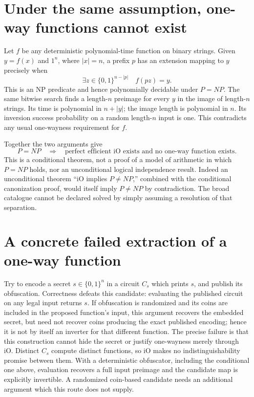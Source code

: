 \documentclass[11pt]{article}
\begin{document}
\section{Under the same assumption, one-way functions cannot exist}
Let $f$ be any deterministic polynomial-time function on binary strings.
Given $y=f(x)$ and $1^n$, where $|x|=n$, a prefix $p$ has an extension
mapping to $y$ precisely when
\[
\exists z\in\{0,1\}^{n-|p|}\quad f(pz)=y.
\]
This is an NP predicate and hence polynomially decidable under $P=NP$.
The same bitwise search finds a length-$n$ preimage for every $y$ in
the image of length-$n$ strings. Its time is polynomial in $n+|y|$;
the image length is polynomial in $n$. Its inversion success probability
on a random length-$n$ input is one. This contradicts any usual
one-wayness requirement for $f$.

Together the two arguments give
\[
P=NP\quad\Longrightarrow\quad
\text{perfect efficient iO exists and no one-way function exists}.
\]
This is a conditional theorem, not a proof of a model of arithmetic in
which $P=NP$ holds, nor an unconditional logical independence result.
Indeed an unconditional theorem ``iO implies $P\ne NP$,'' combined with
the conditional canonization proof, would itself imply $P\ne NP$ by
contradiction. The broad catalogue cannot be declared solved by simply
assuming a resolution of that separation.

\section{A concrete failed extraction of a one-way function}
Try to encode a secret $s\in\{0,1\}^n$ in a circuit $C_s$ which prints
$s$, and publish its obfuscation. Correctness defeats this candidate:
evaluating the published circuit on any legal input returns $s$.
If obfuscation is randomized and its coins are included in the proposed
function's input, this argument recovers the embedded secret, but need
not recover coins producing the exact published encoding; hence it is
not by itself an inverter for that different function. The precise
failure is that this construction cannot hide the secret or justify
one-wayness merely through iO. Distinct $C_s$ compute distinct functions,
so iO makes no indistinguishability promise between them. With a
deterministic obfuscator, including the conditional one above, evaluation
recovers a full input preimage and the candidate map is explicitly
invertible. A randomized coin-based candidate needs an additional
argument which this route does not supply.
\end{document}
